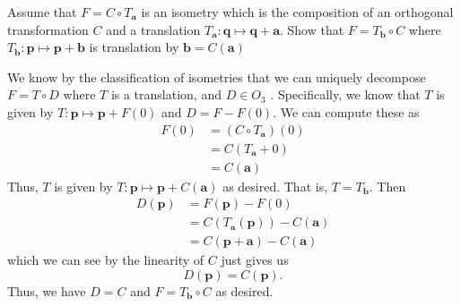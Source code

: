 \documentclass[12 pt, letterpaper]{hmcpset}
\begin{document}
\begin{problem}[Problem 1.]
	Assume that $F = C \circ T_{\mathbf{a}}$ is an isometry which is the composition of an orthogonal transformation $C$ and a translation $T_{\mathbf{a}} : \mathbf{q} \mapsto \mathbf{q} + \mathbf{a}$. Show that $F = T_{\mathbf{b}} \circ C$ where $T_{\mathbf{b}} : \mathbf{p} \mapsto \mathbf{p} + \mathbf{b}$ is translation by $\mathbf{b} = C(\mathbf{a})$
\end{problem}

\begin{solution}
	We know by the classification of isometries that we can uniquely decompose $F = T \circ D$  where $T$  is a translation, and $D \in O_{3}$ . Specifically, we know that $T$  is given by $T : \mathbf{p} \mapsto \mathbf{p} + F(0)$ and $D = F - F(0)$. We can compute these as
	\[
		\begin{split}
			F(0) & = (C \circ T_{\mathbf{a}})(0) \\
			     & = C(T_{\mathbf{a}} + 0) \\
			     & = C(\mathbf{a})
		\end{split}
	\]
	Thus, $T$  is given by $T : \mathbf{p} \mapsto \mathbf{p} + C(\mathbf{a})$  as desired. That is, $T = T_{\mathbf{b}}$. Then
	\[
		\begin{split}
			D(\mathbf{p}) & = F(\mathbf{p}) - F(0) \\
				      & = C(T_{\mathbf{a}}(\mathbf{p})) - C(\mathbf{a}) \\
				      & = C(\mathbf{p} + \mathbf{a}) - C(\mathbf{a})
		\end{split}
	\]
	which we can see by the linearity of $C$ just gives us
	\[
		D(\mathbf{p}) = C(\mathbf{p}).
	\]
	Thus, we have $D = C$ and $F = T_{\mathbf{b}} \circ C$ as desired.
\end{solution}

\pagebreak
\end{document}
